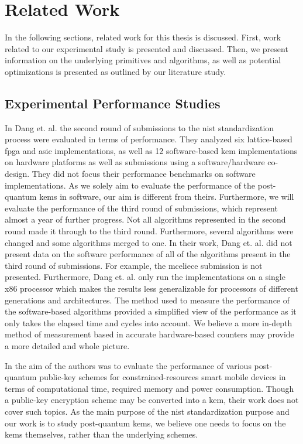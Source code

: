 \chapter{Related Work}
\label{chapter:related-work}

In the following sections, related work for this thesis is discussed. First, work related to our experimental study is presented and discussed. Then, we present information on the underlying primitives and algorithms, as well as potential optimizations is presented as outlined by our literature study.

\section{Experimental Performance Studies}

\noindent In \cite{viet2020} Dang et. al. the second round of submissions to the \gls{nist} standardization process were evaluated in terms of performance. They analyzed six lattice-based \gls{fpga} and \gls{asic} implementations, as well as 12 software-based \gls{kem} implementations on hardware platforms as well as submissions using a software/hardware co-design. They did not focus their performance benchmarks on software implementations. As we solely aim to evaluate the performance of the \gls{post-quantum} \glspl{kem} in software, our aim is different from theirs. Furthermore, we will evaluate the performance of the third round of submissions, which represent almost a year of further progress. Not all algorithms represented in the second round made it through to the third round. Furthermore, several algorithms were changed and some algorithms merged to one. In their work, Dang et. al. did not present data on the software performance of all of the algorithms present in the third round of submissions. For example, the \gls{mceliece} submission is not presented. Furthermore, Dang et. al. only run the implementations on a single \gls{x86} processor which makes the results less generalizable for processors of different generations and architectures. The method used to measure the performance of the software-based algorithms provided a simplified view of the performance as it only takes the elapsed time and cycles into account. We believe a more in-depth method of measurement based in accurate hardware-based counters may provide a more detailed and whole picture.

In \cite{chikouche2018} the aim of the authors was to evaluate the performance of various \gls{post-quantum} public-key schemes for constrained-resources smart mobile devices in terms of computational time, required memory and power consumption. Though a public-key encryption scheme may be converted into a \gls{kem}, their work does not cover such topics. As the main purpose of the \gls{nist} standardization purpose and our work is to study \gls{post-quantum} \glspl{kem}, we believe one needs to focus on the \glspl{kem} themselves, rather than the underlying schemes.

